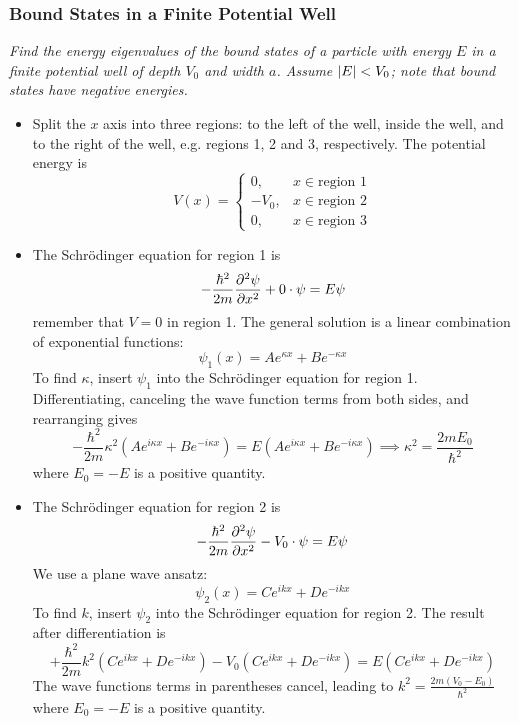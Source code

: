 \documentclass[11pt, a4paper]{article}
\newcommand{\schro}{Schr\"{o}dinger\xspace}
\begin{document}
\subsubsection{Bound States in a Finite Potential Well}
\textit{Find the energy eigenvalues of the bound states of a particle with energy $ E $ in a finite potential well of depth $ V_{0} $ and width $ a $. Assume $ \abs{E} < V_{0} $; note that bound states have negative energies.}
\begin{itemize}
	\item Split the $ x $ axis into three regions: to the left of the well, inside the well, and to the right of the well, e.g. regions 1, 2 and 3, respectively. The potential energy is
	\begin{equation*}
		V(x) =
		\begin{cases}
			0, & x \in \text{region 1}\\
			- V_{0}, & x \in \text{region 2}\\
			0, & x \in \text{region 3}
		\end{cases}
	\end{equation*}
	
	\item The \schro equation for region 1 is
	\begin{equation*}
		- \frac{\hbar^{2}}{2m}\pdv[2]{\psi}{x} + 0 \cdot \psi = E \psi 
	\end{equation*}
	remember that $ V = 0 $ in region 1. The general solution is a linear combination of exponential functions:
	\begin{equation*}
		\psi_{1}(x) = A e^{\kappa x} + B e^{- \kappa x}
	\end{equation*}
	To find $ \kappa $, insert $ \psi_{1} $ into the \schro equation for region 1. Differentiating, canceling the wave function terms from both sides, and rearranging gives
	\begin{equation*}
		-\frac{\hbar^{2}}{2m} \kappa^{2}\left(Ae^{i\kappa x} + B e^{- i\kappa x}\right) = E \left(A e^{i\kappa x} + B e^{- i\kappa x}\right) \implies \kappa^{2} = \frac{2mE_{0}}{\hbar^{2}}
	\end{equation*}
	where $ E_{0} = - E $ is a positive quantity.
	
	\item The \schro equation for region 2 is
	\begin{equation*}
		- \frac{\hbar^{2}}{2m}\pdv[2]{\psi}{x} - V_{0} \cdot \psi = E \psi
	\end{equation*}
	We use a plane wave ansatz:
	\begin{equation*}
		\psi_{2}(x) = Ce^{ikx} + De^{-ikx}
	\end{equation*}
	To find $ k $, insert $ \psi_{2} $ into the \schro equation for region 2. The result after differentiation is
	\begin{equation*}
		+\frac{\hbar^{2}}{2m} k^{2}\left(Ce^{ik x} + D e^{- ik x}\right) - V_{0}\left(C e^{ik x} + D e^{- ik x}\right)  = E \left(C e^{ik x} + D e^{- ik x}\right) 
	\end{equation*}
	The wave functions terms in parentheses cancel, leading to $ k^{2} = \frac{2m(V_{0}-E_{0})}{\hbar^{2}} $ where $ E_{0} = - E $ is a positive quantity.
	

\end{itemize}
\end{document}
